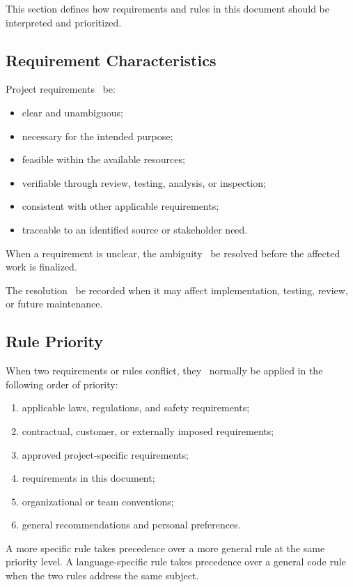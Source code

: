 This section defines how requirements and rules in this document should be interpreted and prioritized.

\subsection{Requirement Characteristics}

Project requirements \should~be:
\begin{itemize}
    \item clear and unambiguous;
    \item necessary for the intended purpose;
    \item feasible within the available resources;
    \item verifiable through review, testing, analysis, or inspection;
    \item consistent with other applicable requirements;
    \item traceable to an identified source or stakeholder need.
\end{itemize}

When a requirement is unclear, the ambiguity \should~be resolved before the affected work is finalized.

The resolution \should~be recorded when it may affect implementation, testing, review, or future maintenance.

\subsection{Rule Priority}

When two requirements or rules conflict, they \should~normally be applied in the following order of priority:
\begin{enumerate}
    \item applicable laws, regulations, and safety requirements;
    \item contractual, customer, or externally imposed requirements;
    \item approved project-specific requirements;
    \item requirements in this document;
    \item organizational or team conventions;
    \item general recommendations and personal preferences.
\end{enumerate}

A more specific rule takes precedence over a more general rule at the same priority level. A language-specific rule takes precedence over a general code rule when the two rules address the same subject.

